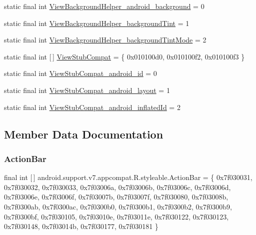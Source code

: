 \begin{DoxyCompactItemize}
\item 
static final int \mbox{\hyperlink{classandroid_1_1support_1_1v7_1_1appcompat_1_1R_1_1styleable_a5964669ca9aa4257bb4ee0b74c819596}{View\+Background\+Helper\+\_\+android\+\_\+background}} = 0
\item 
static final int \mbox{\hyperlink{classandroid_1_1support_1_1v7_1_1appcompat_1_1R_1_1styleable_a0cb0c8e242c16e1370ae67bc0f2977e0}{View\+Background\+Helper\+\_\+background\+Tint}} = 1
\item 
static final int \mbox{\hyperlink{classandroid_1_1support_1_1v7_1_1appcompat_1_1R_1_1styleable_a6611327290a47817f92d3cd27e5ed123}{View\+Background\+Helper\+\_\+background\+Tint\+Mode}} = 2
\item 
static final int \mbox{[}$\,$\mbox{]} \mbox{\hyperlink{classandroid_1_1support_1_1v7_1_1appcompat_1_1R_1_1styleable_a59b69ba1b80ee4157819f6b964a66358}{View\+Stub\+Compat}} = \{ 0x010100d0, 0x010100f2, 0x010100f3 \}
\item 
static final int \mbox{\hyperlink{classandroid_1_1support_1_1v7_1_1appcompat_1_1R_1_1styleable_a5321961e015b50c6ca753c1e84a8ad5d}{View\+Stub\+Compat\+\_\+android\+\_\+id}} = 0
\item 
static final int \mbox{\hyperlink{classandroid_1_1support_1_1v7_1_1appcompat_1_1R_1_1styleable_a1850da4fab00e8c58cb80eccbffa9339}{View\+Stub\+Compat\+\_\+android\+\_\+layout}} = 1
\item 
static final int \mbox{\hyperlink{classandroid_1_1support_1_1v7_1_1appcompat_1_1R_1_1styleable_a97435b8e5b04b2c3db3118b09480f403}{View\+Stub\+Compat\+\_\+android\+\_\+inflated\+Id}} = 2
\end{DoxyCompactItemize}


\subsection{Member Data Documentation}
\mbox{\label{classandroid_1_1support_1_1v7_1_1appcompat_1_1R_1_1styleable_a5941dc15714398e9ec9afaa0155cc1cf}} 
\subsubsection{\texorpdfstring{Action\+Bar}{ActionBar}}
{\footnotesize\ttfamily final int \mbox{[}$\,$\mbox{]} android.\+support.\+v7.\+appcompat.\+R.\+styleable.\+Action\+Bar = \{ 0x7f030031, 0x7f030032, 0x7f030033, 0x7f03006a, 0x7f03006b, 0x7f03006c, 0x7f03006d, 0x7f03006e, 0x7f03006f, 0x7f03007b, 0x7f03007f, 0x7f030080, 0x7f03008b, 0x7f0300ab, 0x7f0300ac, 0x7f0300b0, 0x7f0300b1, 0x7f0300b2, 0x7f0300b9, 0x7f0300bf, 0x7f030105, 0x7f03010e, 0x7f03011e, 0x7f030122, 0x7f030123, 0x7f030148, 0x7f03014b, 0x7f030177, 0x7f030181 \}\hspace{0.3cm}{\ttfamily [static]}}

